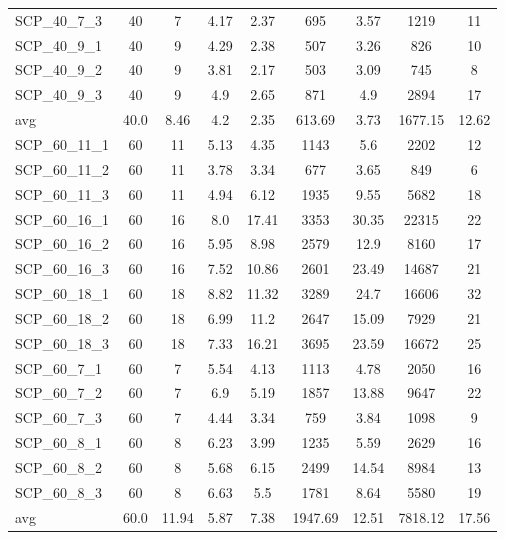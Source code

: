 \begin{table}[!ht]
{\begin{tabular}{lcccccccc}
SCP\_40\_7\_3 & 40 & 7 & 4.17 &  \textcolor{blue2}{2.37} & 695 & 3.57 & 1219 & 11 \\
SCP\_40\_9\_1 & 40 & 9 & 4.29 &  \textcolor{blue2}{2.38} & 507 & 3.26 & 826 & 10 \\
SCP\_40\_9\_2 & 40 & 9 & 3.81 &  \textcolor{blue2}{2.17} & 503 & 3.09 & 745 & 8 \\
SCP\_40\_9\_3 & 40 & 9 & 4.9 &  \textcolor{blue2}{2.65} & 871 & 4.9 & 2894 & 17 \\
\cline{1-9} avg & 40.0 & 8.46 & 4.2 & 2.35& 613.69 & 3.73& 1677.15 & 12.62\\ \cline{1-9}
SCP\_60\_11\_1 & 60 & 11 & 5.13 &  \textcolor{blue2}{4.35} & 1143 & 5.6 & 2202 & 12 \\
SCP\_60\_11\_2 & 60 & 11 & 3.78 &  \textcolor{blue2}{3.34} & 677 & 3.65 & 849 & 6 \\
SCP\_60\_11\_3 & 60 & 11 &  \textcolor{blue2}{4.94} & 6.12 & 1935 & 9.55 & 5682 & 18 \\
SCP\_60\_16\_1 & 60 & 16 &  \textcolor{blue2}{8.0} & 17.41 & 3353 & 30.35 & 22315 & 22 \\
SCP\_60\_16\_2 & 60 & 16 &  \textcolor{blue2}{5.95} & 8.98 & 2579 & 12.9 & 8160 & 17 \\
SCP\_60\_16\_3 & 60 & 16 &  \textcolor{blue2}{7.52} & 10.86 & 2601 & 23.49 & 14687 & 21 \\
SCP\_60\_18\_1 & 60 & 18 &  \textcolor{blue2}{8.82} & 11.32 & 3289 & 24.7 & 16606 & 32 \\
SCP\_60\_18\_2 & 60 & 18 &  \textcolor{blue2}{6.99} & 11.2 & 2647 & 15.09 & 7929 & 21 \\
SCP\_60\_18\_3 & 60 & 18 &  \textcolor{blue2}{7.33} & 16.21 & 3695 & 23.59 & 16672 & 25 \\
SCP\_60\_7\_1 & 60 & 7 & 5.54 &  \textcolor{blue2}{4.13} & 1113 & 4.78 & 2050 & 16 \\
SCP\_60\_7\_2 & 60 & 7 & 6.9 &  \textcolor{blue2}{5.19} & 1857 & 13.88 & 9647 & 22 \\
SCP\_60\_7\_3 & 60 & 7 & 4.44 &  \textcolor{blue2}{3.34} & 759 & 3.84 & 1098 & 9 \\
SCP\_60\_8\_1 & 60 & 8 & 6.23 &  \textcolor{blue2}{3.99} & 1235 & 5.59 & 2629 & 16 \\
SCP\_60\_8\_2 & 60 & 8 &  \textcolor{blue2}{5.68} & 6.15 & 2499 & 14.54 & 8984 & 13 \\
SCP\_60\_8\_3 & 60 & 8 & 6.63 &  \textcolor{blue2}{5.5} & 1781 & 8.64 & 5580 & 19 \\
\cline{1-9} avg & 60.0 & 11.94 & 5.87 & 7.38& 1947.69 & 12.51& 7818.12 & 17.56\\ \cline{1-9}

\end{tabular}}
\end{table}
